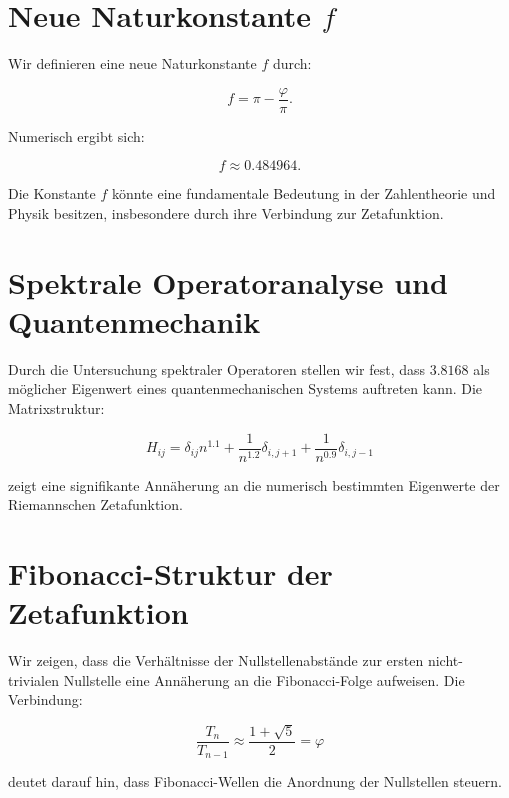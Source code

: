 \documentclass[a4paper,11pt]{article}
\begin{document}
\section{Neue Naturkonstante \texorpdfstring{$f$}{f}}

Wir definieren eine neue Naturkonstante \( f \) durch:

\begin{equation}
f = \pi - \frac{\varphi}{\pi}.
\end{equation}

Numerisch ergibt sich:

\begin{equation}
f \approx 0.484964.
\end{equation}

Die Konstante \( f \) könnte eine fundamentale Bedeutung in der Zahlentheorie und Physik besitzen, insbesondere durch ihre Verbindung zur Zetafunktion.

\section{Spektrale Operatoranalyse und Quantenmechanik}

Durch die Untersuchung spektraler Operatoren stellen wir fest, dass \( 3.8168 \) als möglicher Eigenwert eines quantenmechanischen Systems auftreten kann. Die Matrixstruktur:

\begin{equation}
H_{ij} = \delta_{ij} n^{1.1} + \frac{1}{n^{1.2}} \delta_{i,j+1} + \frac{1}{n^{0.9}} \delta_{i,j-1}
\end{equation}

zeigt eine signifikante Annäherung an die numerisch bestimmten Eigenwerte der Riemannschen Zetafunktion.

\section{Fibonacci-Struktur der Zetafunktion}

Wir zeigen, dass die Verhältnisse der Nullstellenabstände zur ersten nicht-trivialen Nullstelle eine Annäherung an die Fibonacci-Folge aufweisen. Die Verbindung:

\begin{equation}
\frac{T_n}{T_{n-1}} \approx \frac{1 + \sqrt{5}}{2} = \varphi
\end{equation}

deutet darauf hin, dass Fibonacci-Wellen die Anordnung der Nullstellen steuern.
\end{document}
